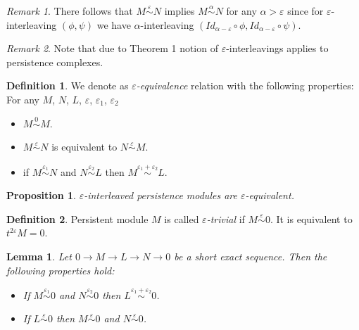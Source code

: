 \documentclass[a4paper, 12pt]{article}
\newtheorem{proposition}{Proposition}
\newtheorem{lemma}{Lemma}
\theoremstyle{definition}
\newtheorem{definition}{Definition}
\theoremstyle{remark}
\newtheorem{remark}{Remark}
\newcommand{\define}[1]{{\textit{#1}}}
\begin{document}
\begin{remark}
There follows that $M \stackrel{\varepsilon}{\sim} N$ implies $M \stackrel{\alpha}{\sim} N$ for any $\alpha > \varepsilon$ since for $\varepsilon$-interleaving $(\phi, \psi)$ we have $\alpha$-interleaving $(Id_{\alpha - \varepsilon} \circ \phi, Id_{\alpha - \varepsilon} \circ \psi)$.
\end{remark}

\begin{remark}
  Note that due to Theorem 1 notion of $\varepsilon$-interleavings applies to persistence complexes.
\end{remark}

\begin{definition}
  We denote as \define{$\varepsilon$-equivalence} relation with the following properties:\\
  For any $M$, $N$, $L$, $\varepsilon$, $\varepsilon_1$, $\varepsilon_2$
  \begin{itemize}
    \item $M \stackrel{0}{\sim} M$.
    \item $M \stackrel{\varepsilon}{\sim} N$ is equivalent to $N \stackrel{\varepsilon}{\sim} M$.
    \item if $M \stackrel{\varepsilon_1}{\sim} N$ and $N \stackrel{\varepsilon_2}{\sim} L$ then $M \stackrel{\varepsilon_1 + \varepsilon_2}{\sim} L$.
  \end{itemize}
\end{definition}

\begin{proposition}
  $\varepsilon$-interleaved persistence modules are $\varepsilon$-equivalent.
\end{proposition}

\begin{definition}
  Persistent module $M$ is called \define{$\varepsilon$-trivial} if $M \stackrel{\varepsilon}{\sim} 0$. It is equivalent to $t^{2\varepsilon}M = 0$.
\end{definition}

\begin{lemma}
  Let $0 \to M \to L \to N \to 0$ be a short exact sequence. Then the following properties hold:
  \begin{itemize}
    \item If $M \stackrel{\varepsilon_1}{\sim} 0$ and $N \stackrel{\varepsilon_2}{\sim} 0$ then $L \stackrel{\varepsilon_1 + \varepsilon_2}{\sim} 0$.
    \item If $L \stackrel{\varepsilon}{\sim} 0$ then $M \stackrel{\varepsilon}{\sim} 0$ and $N \stackrel{\varepsilon}{\sim} 0$.
  \end{itemize}
\end{lemma}
\end{document}
